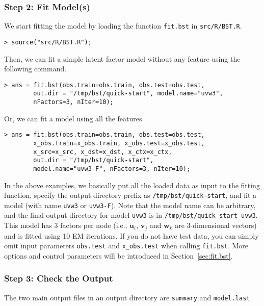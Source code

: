 \subsubsection{Step 2: Fit Model(s)}
We start fitting the model by loading the function {\tt fit.bst} in {\tt src/R/BST.R}. 
{\small\begin{verbatim}
> source("src/R/BST.R");
\end{verbatim}}
\noindent Then, we can fit a simple latent factor model without any feature using the following command.
{\small\begin{verbatim}
> ans = fit.bst(obs.train=obs.train, obs.test=obs.test, 
        out.dir = "/tmp/bst/quick-start", model.name="uvw3", 
        nFactors=3, nIter=10);
\end{verbatim}}
\noindent Or, we can fit a model using all the features.
{\small\begin{verbatim}
> ans = fit.bst(obs.train=obs.train, obs.test=obs.test, 
        x_obs.train=x_obs.train, x_obs.test=x_obs.test,
        x_src=x_src, x_dst=x_dst, x_ctx=x_ctx,
        out.dir = "/tmp/bst/quick-start", 
        model.name="uvw3-F", nFactors=3, nIter=10);
\end{verbatim}}
In the above examples, we basically put all the loaded data as input to the fitting function, specify the output directory prefix as {\tt /tmp/bst/quick-start}, and fit a model (with name {\tt uvw3} or {\tt uvw3-F}). Note that the model name can be arbitrary, and the final output directory for model {\tt uvw3} is in {\tt /tmp/bst/quick-start\_uvw3}.  This model has 3 factors per node (i.e., $\bm{u}_i$, $\bm{v}_j$ and $\bm{w}_k$ are 3-dimensional vectors) and is fitted using 10 EM iterations.  
If you do not have test data, you can simply omit input parameters {\tt obs.test} and {\tt x\_obs.test} when calling {\tt fit.bst}.
More options and control parameters will be introduced in Section~\ref{sec:fit.bst}.

\subsubsection{Step 3: Check the Output}
\label{sec:model-output}

The two main output files in an output directory are {\tt summary} and {\tt model.last}.

